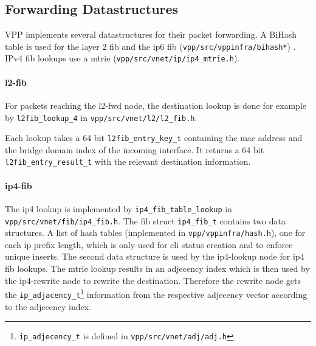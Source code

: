  
\subsection{Forwarding Datastructures}

VPP implements several datastructures for their packet forwarding. A
BiHash table is used for the layer 2 \Ac{fib} and the ip6 \Ac{fib}
(\lstinline|vpp/src/vppinfra/bihash*|) \cite{vppwiki:bihash}. IPv4 \Ac{fib}
lookups use a mtrie (\lstinline|vpp/src/vnet/ip/ip4_mtrie.h|).



\paragraph{l2-fib}

For packets reaching the l2-fwd node, the destination lookup is done
for example by \lstinline|l2fib_lookup_4| in
\lstinline|vpp/src/vnet/l2/l2_fib.h|. 

Each lookup takes a 64 bit \lstinline|l2fib_entry_key_t| containing
the mac address and the bridge domain index of the incoming interface.
It returns a 64 bit \lstinline|l2fib_entry_result_t| with the relevant
destination information. 


\paragraph{ip4-fib}





The ip4 lookup is implemented by \lstinline|ip4_fib_table_lookup| in
\lstinline|vpp/src/vnet/fib/ip4_fib.h|. The \Ac{fib} struct
\lstinline|ip4_fib_t| contains two data structures. A list of hash
tables (implemented in \lstinline|vpp/vppinfra/hash.h|), one for each
ip prefix length, which is only used for \Ac{cli} status creation and
to enforce unique inserts. The second data structure is used by the
ip4-lookup node for ip4 \Ac{fib} lookups. The mtrie lookup results in
an adjecency index which is then used by the ip4-rewrite node to
rewrite the destination. Therefore the rewrite node gets the
\lstinline|ip_adjacency_t|\footnote{\lstinline|ip_adjecency_t| is
defined in \lstinline|vpp/src/vnet/adj/adj.h|} information from the
respective adjecency vector according to the adjecency index.

